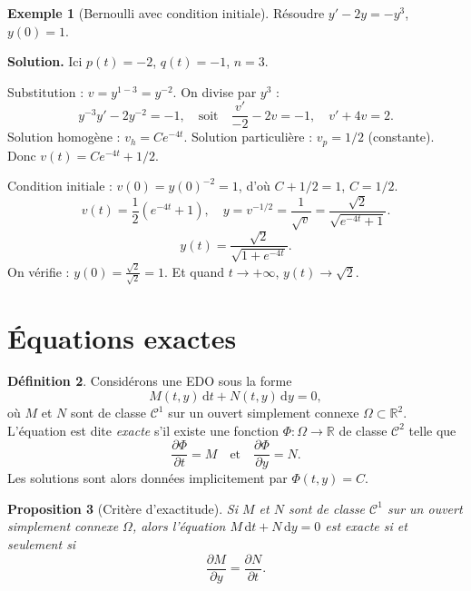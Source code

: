 \documentclass[12pt,a4paper,openany]{book}
\theoremstyle{definition}
\newtheorem{definition}{Définition}[chapter]
\newtheorem{exemple}[definition]{Exemple}
\theoremstyle{plain}
\newtheorem{proposition}[definition]{Proposition}
\theoremstyle{remark}
\newcommand{\R}{\mathbb{R}}
\newcommand{\dd}{\mathrm{d}}
\begin{document}
\begin{exemple}[Bernoulli avec condition initiale]
\label{ex:bernoulli-2}
Résoudre $y' - 2y = -y^3$, $y(0) = 1$.

\textbf{Solution.} Ici $p(t) = -2$, $q(t) = -1$, $n = 3$.

Substitution : $v = y^{1-3} = y^{-2}$. On divise par $y^3$ :
\[
y^{-3}y' - 2y^{-2} = -1, \quad \text{soit} \quad \frac{v'}{-2} - 2v = -1, \quad v' + 4v = 2.
\]
Solution homogène : $v_h = Ce^{-4t}$. Solution particulière : $v_p = 1/2$ (constante). Donc $v(t) = Ce^{-4t} + 1/2$.

Condition initiale : $v(0) = y(0)^{-2} = 1$, d'où $C + 1/2 = 1$, $C = 1/2$.
\[
v(t) = \frac{1}{2}\!\left(e^{-4t} + 1\right), \quad y = v^{-1/2} = \frac{1}{\sqrt{v}} = \frac{\sqrt{2}}{\sqrt{e^{-4t} + 1}}.
\]
\[
\boxed{y(t) = \frac{\sqrt{2}}{\sqrt{1 + e^{-4t}}}.}
\]
On vérifie : $y(0) = \frac{\sqrt{2}}{\sqrt{2}} = 1$. Et quand $t \to +\infty$, $y(t) \to \sqrt{2}$.
\end{exemple}

\section{Équations exactes}
\label{sec:exactes}

\begin{definition}
\label{def:exacte-rappel}
Considérons une EDO sous la forme
\begin{equation}
\label{eq:exacte-forme}
M(t,y)\,\dd t + N(t,y)\,\dd y = 0,
\end{equation}
où $M$ et $N$ sont de classe $\mathscr{C}^1$ sur un ouvert simplement connexe $\Omega \subset \R^2$. L'équation est dite \emph{exacte} s'il existe une fonction $\Phi : \Omega \to \R$ de classe $\mathscr{C}^2$ telle que
\[
\frac{\partial \Phi}{\partial t} = M \quad \text{et} \quad \frac{\partial \Phi}{\partial y} = N.
\]
Les solutions sont alors données implicitement par $\Phi(t, y) = C$.
\end{definition}

\begin{proposition}[Critère d'exactitude]
\label{prop:critere-exactitude}
Si $M$ et $N$ sont de classe $\mathscr{C}^1$ sur un ouvert simplement connexe $\Omega$, alors l'équation $M\,\dd t + N\,\dd y = 0$ est exacte si et seulement si
\begin{equation}
\label{eq:critere-exactitude}
\frac{\partial M}{\partial y} = \frac{\partial N}{\partial t}.
\end{equation}
\end{proposition}
\end{document}
